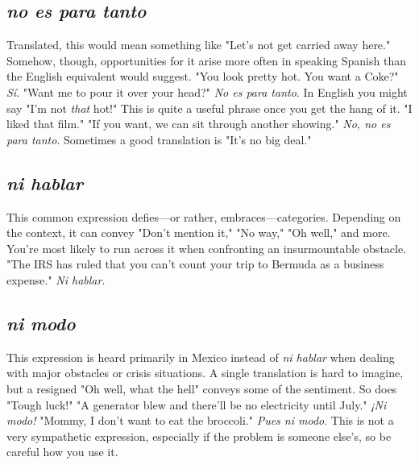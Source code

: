 \subsection{\emph{no es para tanto}}

Translated, this would mean something like "Let's not get carried away here." Somehow, though, opportunities for it arise more often in speaking Spanish than the English equivalent would suggest.
"You look pretty hot. You want a Coke?" \emph{Sí}. "Want me to pour it over
your head?" \emph{No es para tanto}. In English you might say "I'm not \emph{that}
hot!" This is quite a useful phrase once you get the hang of it. "I liked
that film." "If you want, we can sit through another showing." \emph{No, no
es para tanto}. Sometimes a good translation is "It's no big deal."

\subsection{\emph{ni hablar}}

This common expression defies---or rather, embraces---categories. Depending on the context, it can convey "Don't mention it,"
"No way," "Oh well," and more. You're most likely to run across it
when confronting an insurmountable obstacle. "The IRS has ruled
that you can't count your trip to Bermuda as a business expense."
\emph{Ni hablar}.

\subsection{\emph{ni modo}}

This expression is heard primarily in Mexico instead of \emph{ni
hablar} when dealing with major obstacles or crisis situations. A single
translation is hard to imagine, but a resigned "Oh well, what the hell"
conveys some of the sentiment. So does "Tough luck!" "A generator
blew and there'll be no electricity until July." \emph{¡Ni modo!} "Mommy, I
don't want to eat the broccoli." \emph{Pues ni modo}. This is not a very sympathetic expression, especially if the problem is someone else's, so be
careful how you use it.


